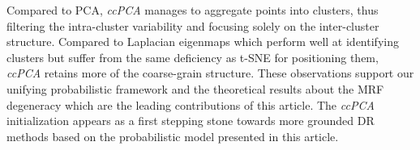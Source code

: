 Compared to PCA, \textit{ccPCA} manages to aggregate points into clusters, thus filtering the intra-cluster variability and focusing solely on the inter-cluster structure. Compared to Laplacian eigenmaps which perform well at identifying clusters but suffer from the same deficiency as t-SNE for positioning them, \textit{ccPCA} retains more of the coarse-grain structure. These observations support our unifying probabilistic framework and the theoretical results about the MRF degeneracy which are the leading contributions of this article. The \textit{ccPCA} initialization appears as a first stepping stone towards more grounded DR methods based on the probabilistic model presented in this article.